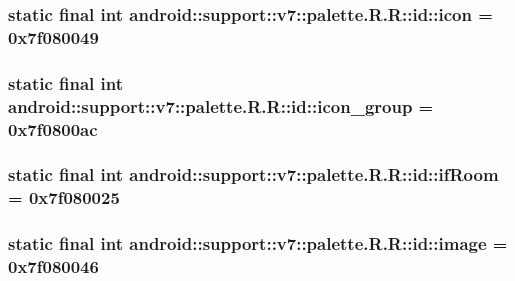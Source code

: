 \hypertarget{classandroid_1_1support_1_1v7_1_1palette_1_1_r_1_1id_7b888a57ccbbeb710251642d6ec897e2}{
\subsubsection[{icon}]{\setlength{\rightskip}{0pt plus 5cm}static final int android::support::v7::palette.R.R::id::icon = 0x7f080049}}
\label{classandroid_1_1support_1_1v7_1_1palette_1_1_r_1_1id_7b888a57ccbbeb710251642d6ec897e2}


\hypertarget{classandroid_1_1support_1_1v7_1_1palette_1_1_r_1_1id_830570e01ddfa4ab93333e5521d34d48}{
\subsubsection[{icon\_\-group}]{\setlength{\rightskip}{0pt plus 5cm}static final int android::support::v7::palette.R.R::id::icon\_\-group = 0x7f0800ac}}
\label{classandroid_1_1support_1_1v7_1_1palette_1_1_r_1_1id_830570e01ddfa4ab93333e5521d34d48}


\hypertarget{classandroid_1_1support_1_1v7_1_1palette_1_1_r_1_1id_7fb64772d75f1faa41a3e79835457ccc}{
\subsubsection[{ifRoom}]{\setlength{\rightskip}{0pt plus 5cm}static final int android::support::v7::palette.R.R::id::ifRoom = 0x7f080025}}
\label{classandroid_1_1support_1_1v7_1_1palette_1_1_r_1_1id_7fb64772d75f1faa41a3e79835457ccc}


\hypertarget{classandroid_1_1support_1_1v7_1_1palette_1_1_r_1_1id_1bb4f49aa8c80a050bb81826fe113ee9}{
\subsubsection[{image}]{\setlength{\rightskip}{0pt plus 5cm}static final int android::support::v7::palette.R.R::id::image = 0x7f080046}}
\label{classandroid_1_1support_1_1v7_1_1palette_1_1_r_1_1id_1bb4f49aa8c80a050bb81826fe113ee9}



